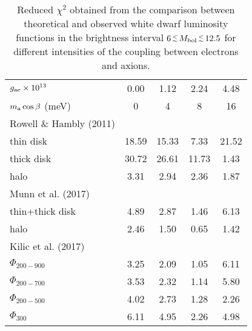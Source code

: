 \documentclass[useAMS,usenatbib]{mnras}
\newcommand{\lppr}{\stackrel{<}{\scriptstyle \sim}}
\newcommand{\lappr}{\raisebox{-0.4ex}{$\lppr$}}
\begin{document}
\begin{table}
	\centering
	\caption{Reduced $\chi^2$ obtained from the comparison between theoretical and observed white dwarf luminosity functions in the brightness interval $6\, \lappr \, M_{\rm bol} \, \lappr \, 12.5$ for different intensities of the coupling between electrons and axions.}
	\label{tab1}
	\begin{tabular}{lcccc} 
		\hline
		$g_{\rm ae}\times 10^{13}$   & 0.00 & 1.12 & 2.24 & 4.48 \\
                 $m_{\rm a} \cos \beta$ (meV) & 0  &     4   &   8    & 16    \\
		\hline
                   Rowell \& Hambly (2011)     &         &         &         &          \\
                   \hline
                   thin disk                             &18.59&15.33& 7.33 &21.52 \\
                   thick disk                           &30.72&26.61& 11.73& 1.43 \\
                   halo                                    &  3.31& 2.94 &  2.36 & 1.87  \\
                   \hline
                   Munn et al. (2017)                &          &         &         &          \\
                   \hline
                   thin+thick disk                  &  4.89 & 2.87 &  1.46 &  6.13 \\
                   halo                                    &  2.46 & 1.50 &  0.65 & 1.42 \\
		\hline
                   Kilic et al. (2017)                  &          &         &         &          \\
                   \hline
                    $\Phi_{200-900}$             &  3.25 & 2.09 &  1.05&  6.11  \\
                    $\Phi_{200-700}$             &  3.53 & 2.32 &  1.14&  5.80  \\
                    $\Phi_{200-500}$             &  4.02& 2.73  &  1.28&  2.26  \\
                    $\Phi_{300}$                     &  6.11& 4.95  &  2.26&   4.98 \\
		\hline
	\end{tabular}
\end{table}
\end{document}
